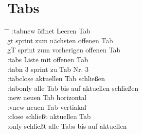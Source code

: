 \documentclass[a4paper,11pt,twoside]{article}
\begin{document}
\section*{Tabs}
\begin{tabbing}
  \hspace{3mm} \= \hspace{20mm} \= \kill
  \> :tabnew \> öffnet Leeren Tab \\ 
  \> gt \> sprint zum nächsten offenen Tab \\ 
  \> gT \> sprint zum vorherigen offenen Tab \\ 
  \> :tabs \> Liste mit offenen Tab \\ 
  \> :tabn 3 \> sprint zu Tab Nr. 3 \\ 
  \> :tabclose \> aktuellen Tab schließen \\ 
  \> :tabonly \> alle Tab bis auf aktuellen schließen \\
  \> :new \> neuen Tab horizontal \\ 
  \> :vnew \> neuen Tab vertiakal \\ 
  \> :close \> schließt aktuellen Tab \\ 
  \> :only \> schließt alle Tabs bis auf aktuellen \\ 
\end{tabbing}
\end{document}
